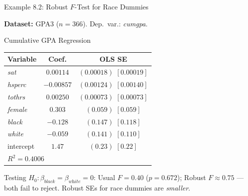 \documentclass[aspectratio=169, 12pt]{beamer}
\begin{document}
\begin{frame}[shrink=15]{Example 8.2: Robust $F$-Test for Race Dummies}

  \textbf{Dataset:} GPA3 ($n=366$). Dep.\ var.: \textit{cumgpa}.

  \begin{examplebox}{Cumulative GPA Regression}
    \begin{center}
      \footnotesize
      \begin{tabular}{lcc}
        \toprule
        Variable & Coef. & OLS SE \quad [Robust SE] \\
        \midrule
        \textit{sat}    & $0.00114$ & $(0.00018)$ \quad $[0.00019]$ \\
        \textit{hsperc} & $-0.00857$ & $(0.00124)$ \quad $[0.00140]$ \\
        \textit{tothrs} & $0.00250$ & $(0.00073)$ \quad $[0.00073]$ \\
        \textit{female} & $0.303$ & $(0.059)$ \quad $[0.059]$ \\
        \textit{black}  & $-0.128$ & $(0.147)$ \quad $[0.118]$ \\
        \textit{white}  & $-0.059$ & $(0.141)$ \quad $[0.110]$ \\
        intercept       & $1.47$ & $(0.23)$ \quad $[0.22]$ \\
        \midrule
        \multicolumn{3}{l}{$R^2 = 0.4006$} \\
        \bottomrule
      \end{tabular}
    \end{center}
  \end{examplebox}

  \begin{keybox}
    Testing $H_0: \beta_{\textit{black}} = \beta_{\textit{white}} = 0$: Usual $F = 0.40$ ($p=0.672$); Robust $F \approx 0.75$ — both fail to reject. Robust SEs for race dummies are \textit{smaller}.
  \end{keybox}

\end{frame}
\end{document}
